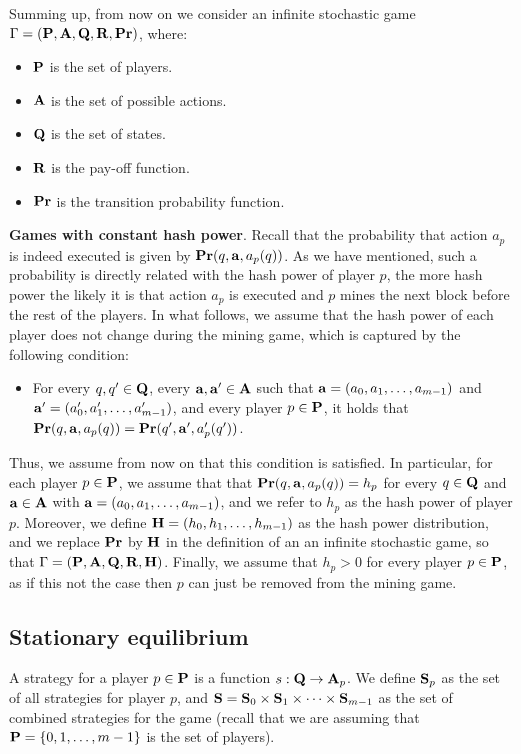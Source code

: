 Summing up, from now on we consider an infinite stochastic game $\Gamma = (\mathbf{P},\mathbf{A},\mathbf{Q},\mathbf{R},\mathbf{Pr})$, where:
\begin{itemize}
	\item $\mathbf{P}$ is the set of players.
	\item $\mathbf{A}$ is the set of possible actions.
	\item $\mathbf{Q}$ is the set of states.
	\item $\mathbf{R}$ is the pay-off function.
	\item $\mathbf{Pr}$ is the transition probability function.
\end{itemize} 

\medskip
\noindent
\textbf{Games with constant hash power}.
Recall that the probability that action $a_p$ is indeed executed is given by $\mathbf{Pr}(q, \mathbf{a}, a_p(q))$. As we have mentioned, such a probability is directly related with the hash power of player $p$, the more hash power the likely it is that action $a_p$ is executed and $p$ mines the next block before the rest of the players. In what follows, we assume that the hash power of each player does not change during the mining game, which is captured by the following condition:
\begin{itemize}
\item For every $q, q' \in \mathbf{Q}$, every $\mathbf{a}, \mathbf{a}' \in \mathbf{A}$ such that $\mathbf{a} = (a_0, a_1, \ldots, a_{m-1})$ and $\mathbf{a}' = (a'_0, a'_1, \ldots, a'_{m-1})$,  and every player $p \in \mathbf{P}$, it holds that $\mathbf{Pr}(q, \mathbf{a}, a_p(q)) = \mathbf{Pr}(q', \mathbf{a}', a'_p(q'))$.
\end{itemize}
Thus, we assume from now on that this condition is satisfied. In particular, for each player $p \in \mathbf{P}$, we assume that that 
$\mathbf{Pr}(q, \mathbf{a}, a_p(q)) = h_p$ for every $q \in \mathbf{Q}$ and $\mathbf{a} \in \mathbf{A}$ with $\mathbf{a} = (a_0, a_1, \ldots, a_{m-1})$, and we refer to $h_p$ as the hash power of player $p$. Moreover, we define $\mathbf{H} = (h_0, h_1, \ldots, h_{m-1})$ as the hash power distribution, and we replace $\mathbf{Pr}$ by $\mathbf{H}$ in the definition of an an infinite stochastic game, so that $\Gamma = (\mathbf{P},\mathbf{A},\mathbf{Q},\mathbf{R},\mathbf{H})$. Finally, we assume that $h_p > 0$ for every player $p \in \mathbf{P}$, as if this not the case then $p$ can just be removed from the mining game. 

\subsection{Stationary equilibrium}
A strategy for a player $p \in \mathbf{P}$ is a function $s : \mathbf{Q} \rightarrow \mathbf{A}_p$. 
We define $\mathbf{S}_p$ as the set of all strategies for player $p$, and $\mathbf{S} = \mathbf{S}_0 \times \mathbf{S}_{1} \times \cdots \times \mathbf{S}_{m-1}$ as the set of combined strategies for the game (recall that we are assuming that $\mathbf{P} = \{0, 1, \ldots, m-1\}$ is the set of players). 

